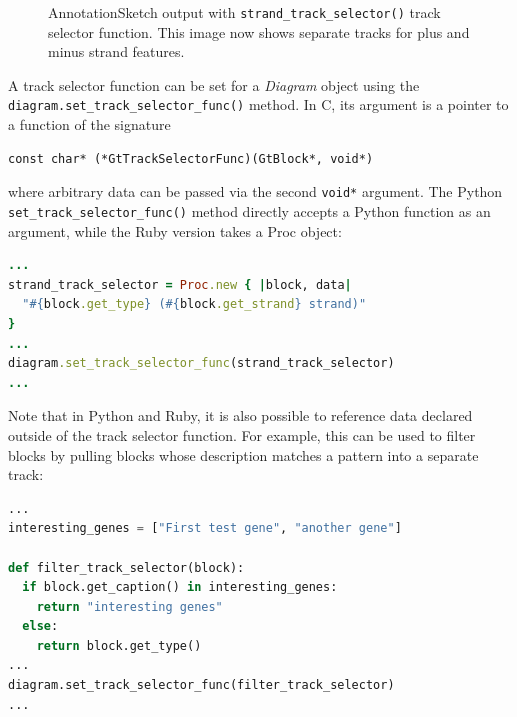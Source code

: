 \documentclass[a4paper]{scrreprt}
\begin{document}
\begin{figure}[ht]
\caption{AnnotationSketch output with \texttt{strand\_track\_se\-lector()} track selector function. This image now shows separate tracks for plus and minus strand features.}
\label{tsexample2}
\end{figure}

A track selector function can be set for a \emph{Diagram} object using the \texttt{diagram.set\_track\_se\-lec\-tor\_func()} method. In C, its argument is a pointer to a function of the signature
\medskip
\begin{verbatim}
const char* (*GtTrackSelectorFunc)(GtBlock*, void*)
\end{verbatim}
\medskip
where arbitrary data can be passed via the second \texttt{void*} argument. The Python \texttt{set\_track\_se\-lec\-tor\_func()} method directly accepts a Python function as an argument, while the Ruby version takes a Proc object:

\begin{lstlisting}[language=Ruby, showstringspaces=false,numbers=none,frame=single]
...
strand_track_selector = Proc.new { |block, data|
  "#{block.get_type} (#{block.get_strand} strand)"
}
...
diagram.set_track_selector_func(strand_track_selector)
...
\end{lstlisting}

Note that in Python and Ruby, it is also possible to reference data declared outside of the track selector function. For example, this can be used to filter blocks by pulling blocks whose description matches a pattern into a separate track:

\begin{lstlisting}[language=Python, showstringspaces=false,numbers=none,frame=single]
...
interesting_genes = ["First test gene", "another gene"]

def filter_track_selector(block):
  if block.get_caption() in interesting_genes:
    return "interesting genes"
  else:
    return block.get_type()
...
diagram.set_track_selector_func(filter_track_selector)
...
\end{lstlisting}
\end{document}
